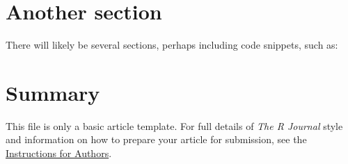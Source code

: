 \section{Another section}

There will likely be several sections, perhaps including code snippets, such as:


\section{Summary}

This file is only a basic article template. For full details of \emph{The R Journal} style and information on how to prepare your article for submission, see the \href{http://journal.r-project.org/latex/RJauthorguide.pdf}{Instructions for Authors}.


\address{Martijn Tennekes\\
  Statistics Netherlands\\
  CBS-Weg 11, 6412 EX Heerlen\\
  Netherlands\\}


